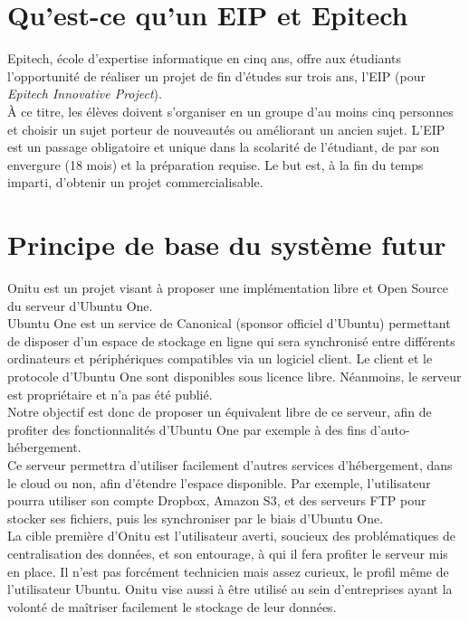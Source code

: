 \section{Qu'est-ce qu'un EIP et Epitech}
Epitech, école d'expertise informatique en cinq ans, offre aux étudiants l'opportunité de réaliser un projet de fin d'études sur trois ans, l'EIP (pour \emph{Epitech Innovative Project}).\\

À ce titre, les élèves doivent s'organiser en un groupe d'au moins cinq personnes et choisir un sujet porteur de nouveautés ou améliorant un ancien sujet. L'EIP est un passage obligatoire et unique dans la scolarité de l'étudiant, de par son envergure (18 mois) et la préparation requise. Le but est, à la fin du temps imparti, d'obtenir un projet commercialisable.


\section{Principe de base du système futur}
    Onitu est un projet visant à proposer une implémentation libre et Open Source du serveur d’Ubuntu One.\\

    Ubuntu One est un service de Canonical (sponsor officiel d'Ubuntu) permettant de disposer d’un espace de stockage en ligne qui sera synchronisé entre différents ordinateurs et périphériques compatibles via un logiciel client. Le client et le protocole d’Ubuntu One sont disponibles sous licence libre. Néanmoins, le serveur est propriétaire et n’a pas été publié.\\

    Notre objectif est donc de proposer un équivalent libre de ce serveur, afin
    de profiter des fonctionnalités d’Ubuntu One par exemple à des fins d’auto-hébergement.\\

    Ce serveur permettra d'utiliser facilement d'autres services d'hébergement, dans le cloud ou non, afin d'étendre l'espace disponible. Par exemple, l'utilisateur pourra utiliser son compte Dropbox, Amazon S3, et des serveurs FTP pour stocker ses fichiers, puis les synchroniser par le biais d'Ubuntu One.\\

    La cible première d'Onitu est l'utilisateur averti, soucieux des problématiques de centralisation des données, et son entourage, à qui il fera profiter le serveur mis en place. Il n'est pas forcément technicien mais assez curieux, le profil même de l'utilisateur Ubuntu.
    Onitu vise aussi à être utilisé au sein d'entreprises ayant la volonté de maîtriser facilement le stockage de leur données.\\
